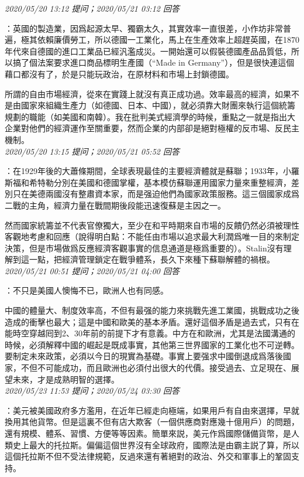 \documentclass[twocolumn]{ctexart}
\begin{document}
\textit{\hfill\noindent\small 2020/05/20 13:12 提问；2020/05/21 03:12 回答}

：英國的製造業，因爲起源太早、獨霸太久，其實效率一直很差，小作坊非常普遍，極其依賴廉價勞工，所以德國一工業化，馬上在生產效率上超趕英國，在1870年代來自德國的進口工業品已經汎濫成災。一開始還可以假裝德國產品品質低，所以搞了個法案要求進口商品標明生產國（“Made in Germany”），但是很快連這個藉口都沒有了，於是只能玩政治，在原材料和市場上封鎖德國。

所謂的自由市場經濟，從來在實踐上就沒有真正成功過。效率最高的經濟，如果不是由國家來組織生產力（如德國、日本、中國），就必須靠大財團來執行這個統籌規劃的職能（如美國和南韓）。我在批判美式經濟學的時候，重點之一就是指出大企業對他們的經濟運作至關重要，然而企業的内部卻是絕對極權的反市場、反民主機制。
\\

\textit{\hfill\noindent\small 2020/05/20 13:15 提问；2020/05/21 05:52 回答}

：在1929年後的大蕭條期間，全球表現最佳的主要經濟體就是蘇聯；1933年，小羅斯福和希特勒分別在美國和德國掌權，基本模仿蘇聯運用國家力量來重整經濟，差別只在美德兩國沒有整肅資本家，而是强迫他們為國家政策服務。這三個國家成爲二戰的主角，經濟力量在戰間期後段能迅速復蘇是主因之一。

然而國家統籌並不代表官僚獨大，至少在和平時期來自市場的反饋仍然必須被理性客觀地考慮和回應（說得明白點：不能任由市場以追求最大利潤爲唯一目的來制定決策，但是市場做爲反應經濟客觀事實的信息通道是極爲重要的）。Stalin沒有理解到這一點，把經濟管理鎖定在戰爭體系，長久下來種下蘇聯解體的禍根。
\\

\textit{\hfill\noindent\small 2020/05/21 00:51 提问；2020/05/21 04:00 回答}

：不只是美國人懊悔不已，歐洲人也有同感。

中國的體量大、制度效率高，不但有最强的能力來挑戰先進工業國，挑戰成功之後造成的衝擊也最大；這是中國和歐美的基本矛盾。還好這個矛盾是過去式，只有在能時空穿越囘到2、30年前的前提下才有意義。中方在和歐洲，尤其是法國溝通的時候，必須解釋中國的崛起是既成事實，其他第三世界國家的工業化也不可逆轉。要制定未來政策，必須以今日的現實為基礎。事實上要强求中國倒退成爲落後國家，不但不可能成功，而且歐洲也必須付出很大的代價。接受過去、立足現在、展望未來，才是成熟明智的選擇。
\\

\textit{\hfill\noindent\small 2020/05/23 11:53 提问；2020/05/24 03:30 回答}

：美元被美國政府多方濫用，在近年已經走向極端，如果用戶有自由來選擇，早就換用其他貨幣。但是這裏不但有店大欺客（一個供應商對應幾十億用戶）的問題，還有規模、體系、習慣、方便等等因素。簡單來説，美元作爲國際儲備貨幣，是人類史上最大的托拉斯。偏偏這個世界沒有全球政府，國際法是由霸主説了算，所以這個托拉斯不但不受法律規範，反過來還有著絕對的政治、外交和軍事上的鞏固支持。
\end{document}
